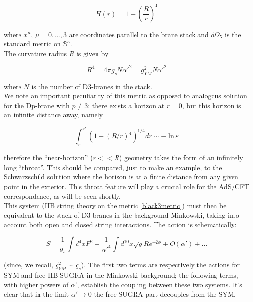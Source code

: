 \begin{equation}
	H(r) = 1 + \left( \frac{R}{r} \right)^4
	\label{}
\end{equation}

where $x^\mu$, $\mu = 0,\ldots,3$ are coordinates parallel to the brane stack and $d\Omega_5$ is the standard metric on $\mathbb{S}^5$.\\

The curvature radius $R$ is given by

\begin{equation}
	R^4 = 4\pi g_s N \alpha'^2 = g_{YM}^2 N \alpha'^2
	\label{}
\end{equation}

where $N$ is the number of D3-branes in the stack.\\

We note an important peculiarity of this metric as opposed to analogous solution for the Dp-brane with $p\neq 3$: there exists a horizon at $r=0$, but this horizon is an infinite distance away, namely

\begin{equation}
	\int_\varepsilon^{r'} \left( 1 + \left( R/r \right)^4 \right)^{1/4} dr \sim -\ln\varepsilon
	\label{}
\end{equation}

therefore the ``near-horizon'' ($r<<R$) geometry takes the form of an infinitely long ``throat''. This should be compared, just to make an example, to the Schwarzschild solution where the horizon is at a finite distance from any given point in the exterior. This throat feature will play a crucial role for the AdS/CFT correspondence, as will be seen shortly.\\

This system (IIB string theory on the metric \ref{black3metric}) must then be equivalent to the stack of D3-branes in the background Minkowski, taking into account both open and closed string interactions. The action is schematically:

\begin{equation}
	S = \frac{1}{g_s} \int d^4 x F^2 + \frac{1}{\alpha'^4} \int d^{10}x \sqrt{g} R e^{-2\phi} + O(\alpha') + \dots
\end{equation}

(since, we recall, $g_{YM}^2 \sim g_s$). The first two terms are respectively the actions for SYM and free IIB SUGRA in the Minkowski background; the following terms, with higher powers of $\alpha'$, establish the coupling between these two systems. It's clear that in the limit $\alpha' \rightarrow 0$ the free SUGRA part decouples from the SYM.\\

